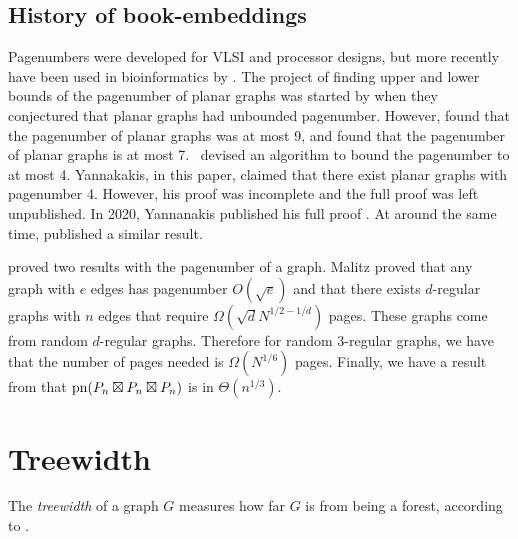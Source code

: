 \subsection{History of book-embeddings}\label{ssec:Pagenumber_History}
Pagenumbers were developed for VLSI and processor designs, but more recently have been used in bioinformatics by \textcite{haslingerRNAStructuresPseudoknots1999}.
The project of finding upper and lower bounds of the pagenumber of planar graphs was started by \textcite{bernhartBookThicknessGraph1979} when they conjectured that planar graphs had unbounded pagenumber. However, \textcite{bussPagenumberPlanarGraphs1984} found that the pagenumber of planar graphs was at most 9, and \textcite{heathEmbeddingPlanarGraphs1984} found that the pagenumber of planar graphs is at most 7.\ \textcite{yannakakisEmbeddingPlanarGraphs1989} devised an algorithm to bound the pagenumber to at most 4. Yannakakis, in this paper, claimed that there exist planar graphs with pagenumber 4. However, his proof was incomplete and the full proof was left unpublished. In 2020, Yannanakis published his full proof \cite{yannakakisPlanarGraphsThat2020}. At around the same time, \textcite{kaufmannFourPagesAre2020} published a similar result.

\textcite{malitzGraphsEdgesHave1994} proved two results with the pagenumber of a graph. Malitz proved that any graph with $e$ edges has pagenumber $O(\sqrt{e})$ and that there exists $d$-regular graphs with $n$ edges that require $\Omega(\sqrt{d} N^{1/2 - 1/d})$ pages. These graphs come from random $d$-regular graphs. Therefore for random 3-regular graphs, we have that the number of pages needed is $\Omega(N^{1/6})$ pages. Finally, we have a result from \textcite{eppsteinThreeDimensionalGraphProducts2024} that $\operatorname{pn}(P_n \boxtimes P_n \boxtimes P_n)$ is in $\Theta(n^{1/3})$.
\section{Treewidth}\label{sec:treewidth}

The \textit{treewidth} of a graph \(G\) measures how far \(G\) is from being a forest, according to \textcite{diestelGraphMinors2017}.

